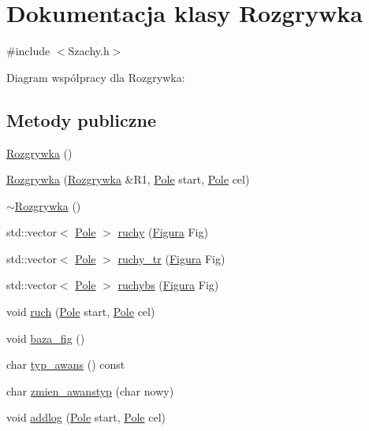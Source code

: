 \hypertarget{class_rozgrywka}{\section{\-Dokumentacja klasy \-Rozgrywka}
\label{class_rozgrywka}
}


{\ttfamily \#include $<$\-Szachy.\-h$>$}



\-Diagram współpracy dla \-Rozgrywka\-:
\subsection*{\-Metody publiczne}
\begin{DoxyCompactItemize}
\item 
\hyperlink{class_rozgrywka_af52c70a887231f981d29958a1813bc1b}{\-Rozgrywka} ()
\item 
\hyperlink{class_rozgrywka_abc5452fdb9fdc845fab5df0536287133}{\-Rozgrywka} (\hyperlink{class_rozgrywka}{\-Rozgrywka} \&\-R1, \hyperlink{class_pole}{\-Pole} start, \hyperlink{class_pole}{\-Pole} cel)
\item 
\hyperlink{class_rozgrywka_a93116ad903e955bc6c7fa76454835608}{$\sim$\-Rozgrywka} ()
\item 
std\-::vector$<$ \hyperlink{class_pole}{\-Pole} $>$ \hyperlink{class_rozgrywka_a4ec65bca4344fd3430b20a95b6ae5990}{ruchy} (\hyperlink{class_figura}{\-Figura} \-Fig)
\item 
std\-::vector$<$ \hyperlink{class_pole}{\-Pole} $>$ \hyperlink{class_rozgrywka_a645745edda67c70e61ccd6c846ea9548}{ruchy\-\_\-tr} (\hyperlink{class_figura}{\-Figura} \-Fig)
\item 
std\-::vector$<$ \hyperlink{class_pole}{\-Pole} $>$ \hyperlink{class_rozgrywka_ac50b0a9d83d128bd38b3f71bd161378c}{ruchybs} (\hyperlink{class_figura}{\-Figura} \-Fig)
\item 
void \hyperlink{class_rozgrywka_ad60dd1bcf48315390eda98b52f6691d7}{ruch} (\hyperlink{class_pole}{\-Pole} start, \hyperlink{class_pole}{\-Pole} cel)
\item 
void \hyperlink{class_rozgrywka_abfd6a95d3288f6756092a3fd1f48caea}{baza\-\_\-fig} ()
\item 
char \hyperlink{class_rozgrywka_a77dd365868aa43addd6b509a1984fa6c}{typ\-\_\-awans} () const 
\item 
char \hyperlink{class_rozgrywka_a5b3772697dbb6f97e642107111adb5a9}{zmien\-\_\-awanstyp} (char nowy)
\item 
void \hyperlink{class_rozgrywka_af2a4087f0bf9db16750b40e4d3d74d34}{addlog} (\hyperlink{class_pole}{\-Pole} start, \hyperlink{class_pole}{\-Pole} cel)

\end{DoxyCompactItemize}
